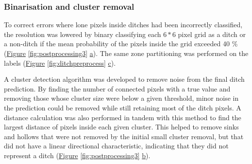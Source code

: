 \documentclass[11pt, review]{elsarticle} %
\begin{document}
\subsubsection{Binarisation and cluster removal}

To correct errors where lone pixels inside ditches had been incorrectly classified, the resolution was lowered by binary classifying each $6*6$ pixel grid as a ditch or a non-ditch if the mean probability of the pixels inside the grid exceeded 40 \% (\hyperref[fig:postprocessing3]{Figure} \ref{fig:postprocessing3} \hyperref[fig:postprocessing3]{a}). The same zone partitioning was performed on the labels (\hyperref[fig:ditchpreprocess]{Figure} \ref{fig:ditchpreprocess} \hyperref[fig:ditchpreprocess]{c}).

A cluster detection algorithm was developed to remove noise from the final ditch prediction. By finding the number of connected pixels with a true value and removing those whose cluster size were below a given threshold, minor noise in the prediction could be removed while still retaining most of the ditch pixels. A distance calculation was also performed in tandem with this method to find the largest distance of pixels inside each given cluster. This helped to remove sinks and hollows that were not removed by the initial small cluster removal, but that did not have a linear directional characteristic, indicating that they did not represent a ditch (\hyperref[fig:postprocessing3]{Figure} \ref{fig:postprocessing3} \hyperref[fig:postprocessing3]{b}).
\end{document}
